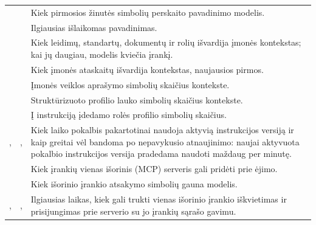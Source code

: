 \begin{xltabular}{\textwidth}{@{}L{44mm}L{19mm}Y@{}}
 &  & Kiek pirmosios žinutės simbolių perskaito pavadinimo modelis. \\
 &  & Ilgiausias išlaikomas pavadinimas. \\
 &  & Kiek leidimų, standartų, dokumentų ir rolių išvardija įmonės kontekstas; kai jų daugiau, modelis kviečia įrankį. \\
 &  & Kiek įmonės ataskaitų išvardija kontekstas, naujausios pirmos. \\
 &  & Įmonės veiklos aprašymo simbolių skaičius kontekste. \\
 &  & Struktūrizuoto profilio lauko simbolių skaičius kontekste. \\
 &  & Į instrukciją įdedamo rolės profilio simbolių skaičius. \\
,  & ,  & Kiek laiko pokalbis pakartotinai naudoja aktyvią instrukcijos versiją ir kaip greitai vėl bandoma po nepavykusio atnaujinimo: naujai aktyvuota pokalbio instrukcijos versija pradedama naudoti maždaug per minutę. \\
 &  & Kiek įrankių vienas išorinis (MCP) serveris gali pridėti prie ėjimo. \\
 &  & Kiek išorinio įrankio atsakymo simbolių gauna modelis. \\
,  & ,  & Ilgiausias laikas, kiek gali trukti vienas išorinio įrankio iškvietimas ir prisijungimas prie serverio su jo įrankių sąrašo gavimu. \\

\end{xltabular}
